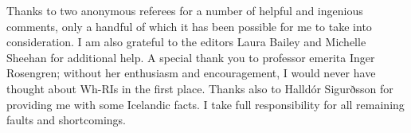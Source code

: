 \documentclass[output=paper]{LSP/langsci}
\begin{document}
Thanks to two anonymous referees for a number of  helpful and ingenious comments, only a handful of which it has been possible for me to take into consideration. I am also grateful to the editors Laura Bailey and Michelle Sheehan for additional help. A special thank you to professor emerita Inger Rosengren; without her enthusiasm and encouragement, I would never have thought about Wh-RIs in the first place. Thanks also to Halldór Sigurðsson for providing me with some {Icelandic} facts. I take full responsibility for all remaining faults and shortcomings.
{\sloppy
\printbibliography[heading=subbibliography,notkeyword=this]
}
\end{document}
